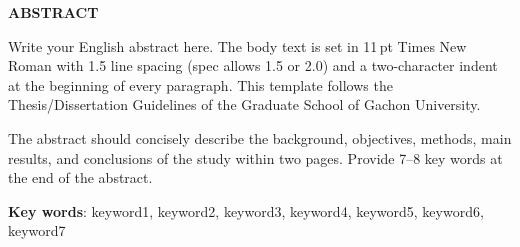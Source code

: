 \clearpage
\thispagestyle{plain}

\begin{center}
{\fontsize{16pt}{22pt}\selectfont\bfseries ABSTRACT\par}

\vspace{6mm}

{\fontsize{14pt}{20pt}\selectfont\bfseries\itshape
  \begin{minipage}{0.82\textwidth}
    \centering
    \ThesisTitleEN\par
  \end{minipage}\par}
\end{center}

\vspace{6mm}

\begin{flushright}
{\fontsize{12pt}{18pt}\selectfont
\AuthorEN\par
\DepartmentEN\par
\GraduateSchoolEN\par}
\end{flushright}

\vspace{8mm}


Write your English abstract here. The body text is set in 11\,pt Times New Roman
with 1.5 line spacing (spec allows 1.5 or 2.0) and a two-character indent at
the beginning of every paragraph. This template follows the Thesis/Dissertation
Guidelines of the Graduate School of Gachon University.

The abstract should concisely describe the background, objectives, methods,
main results, and conclusions of the study within two pages. Provide 7--8 key
words at the end of the abstract.

\vfill

\noindent\textbf{Key words}: keyword1, keyword2, keyword3, keyword4, keyword5, keyword6, keyword7

\clearpage
